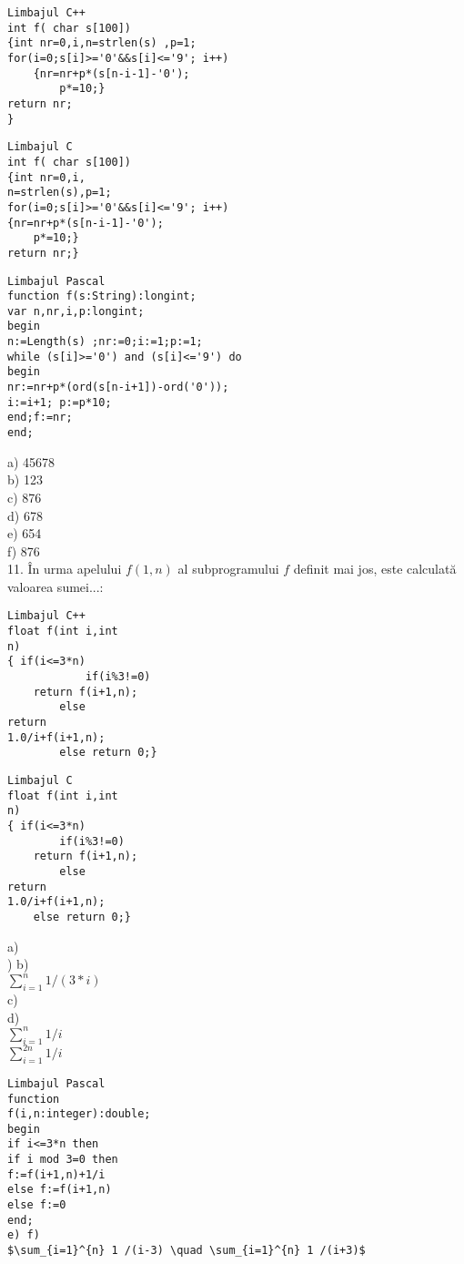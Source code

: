 \begin{verbatim}
Limbajul C++
int f( char s[100])
{int nr=0,i,n=strlen(s) ,p=1;
for(i=0;s[i]>='0'&&s[i]<='9'; i++)
    {nr=nr+p*(s[n-i-1]-'0');
        p*=10;}
return nr;
}
\end{verbatim}

\begin{verbatim}
Limbajul C
int f( char s[100])
{int nr=0,i,
n=strlen(s),p=1;
for(i=0;s[i]>='0'&&s[i]<='9'; i++)
{nr=nr+p*(s[n-i-1]-'0');
    p*=10;}
return nr;}
\end{verbatim}

\begin{verbatim}
Limbajul Pascal
function f(s:String):longint;
var n,nr,i,p:longint;
begin
n:=Length(s) ;nr:=0;i:=1;p:=1;
while (s[i]>='0') and (s[i]<='9') do
begin
nr:=nr+p*(ord(s[n-i+1])-ord('0'));
i:=i+1; p:=p*10;
end;f:=nr;
end;
\end{verbatim}

a) 45678\\
b) 123\\
c) 876\\
d) 678\\
e) 654\\
f) 876\\
11. În urma apelului $f(1, n)$ al subprogramului $f$ definit mai jos, este calculată valoarea sumei...:

\begin{verbatim}
Limbajul C++
float f(int i,int
n)
{ if(i<=3*n)
            if(i%3!=0)
    return f(i+1,n);
        else
return
1.0/i+f(i+1,n);
        else return 0;}
\end{verbatim}

\begin{verbatim}
Limbajul C
float f(int i,int
n)
{ if(i<=3*n)
        if(i%3!=0)
    return f(i+1,n);
        else
return
1.0/i+f(i+1,n);
    else return 0;}
\end{verbatim}

a)\\
) b)\\
$\sum_{i=1}^{n} 1 /(3 * i)$\\
c)\\
d)\\
$\sum_{i=1}^{n} 1 / i$\\
$\sum_{i=1}^{2 n} 1 / i$

\begin{verbatim}
Limbajul Pascal
function
f(i,n:integer):double;
begin
if i<=3*n then
if i mod 3=0 then
f:=f(i+1,n)+1/i
else f:=f(i+1,n)
else f:=0
end;
e) f)
$\sum_{i=1}^{n} 1 /(i-3) \quad \sum_{i=1}^{n} 1 /(i+3)$
\end{verbatim}

